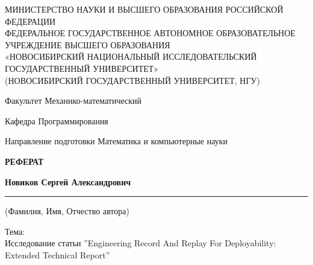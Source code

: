 \thispagestyle{empty}

\begin{center}
  МИНИСТЕРСТВО НАУКИ И ВЫСШЕГО ОБРАЗОВАНИЯ РОССИЙСКОЙ ФЕДЕРАЦИИ \\
  ФЕДЕРАЛЬНОЕ ГОСУДАРСТВЕННОЕ АВТОНОМНОЕ ОБРАЗОВАТЕЛЬНОЕ УЧРЕЖДЕНИЕ ВЫСШЕГО ОБРАЗОВАНИЯ \\
  «НОВОСИБИРСКИЙ НАЦИОНАЛЬНЫЙ ИССЛЕДОВАТЕЛЬСКИЙ ГОСУДАРСТВЕННЫЙ УНИВЕРСИТЕТ» \\
  (НОВОСИБИРСКИЙ ГОСУДАРСТВЕННЫЙ УНИВЕРСИТЕТ, НГУ)
\end{center}

\vspace{1.5cm}

\noindent %
Факультет \hfill Механико-математический \par

\vspace{1cm}

\noindent
Кафедра \hfill Программирования \par
\noindent
Направление подготовки \hfill Математика и компьютерные науки

\vspace{2cm}

\begin{center}
  \vspace{1em} %
  {\Large \textbf{РЕФЕРАТ}} %
  \vspace{1em} %
\end{center}


\begin{center}
  \textbf{Новиков Сергей Александрович}
  \rule[0.5ex]{\linewidth}{0.4pt}
  \small (Фамилия, Имя, Отчество автора)
\end{center}

\vspace{1.5cm}

\noindent Тема: \\ 
Исследование статьи ''Engineering Record And Replay For
Deployability: Extended Technical Report''

\vspace{1.5cm}

